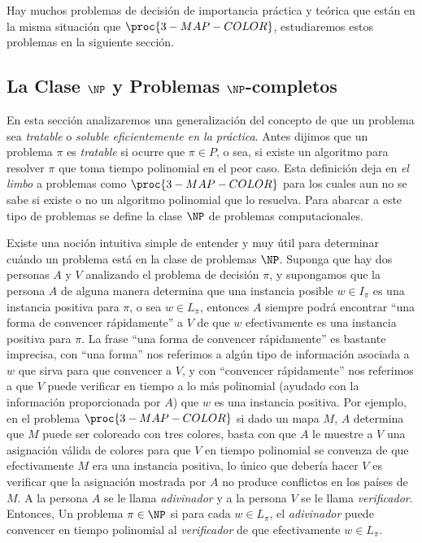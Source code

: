 Hay muchos problemas de decisión de importancia práctica y teórica que están en la misma situación que $\proc{3-MAP-COLOR}$, estudiaremos estos problemas en la siguiente sección.

\subsection{La Clase $\NP$ y Problemas $\NP$-completos}

En esta sección analizaremos una generalización del concepto de que un problema sea \emph{tratable} o \emph{soluble eficientemente en la práctica}.
Antes dijimos que un problema $\pi$ es \emph{tratable} si ocurre que $\pi\in P$, o sea, si existe un algoritmo para resolver $\pi$ que toma tiempo polinomial en el peor caso.
Esta definición deja en \emph{el limbo} a problemas como $\proc{3-MAP-COLOR}$ para los cuales aun no se sabe si existe o no un algoritmo polinomial que lo resuelva.
Para abarcar a este tipo de problemas se define la clase $\NP$ de problemas computacionales.

Existe una noción intuitiva simple de entender y muy útil para determinar cuándo un problema está en la clase de problemas $\NP$.
Suponga que hay dos personas $A$ y $V$ analizando el problema de decisión $\pi$, y supongamos que la persona $A$ de alguna manera determina que una instancia posible $w\in I_\pi$ es una instancia positiva para $\pi$, o sea $w\in L_\pi$, entonces $A$ siempre podrá encontrar ``una forma de convencer rápidamente'' a $V$ de que $w$ efectivamente es una instancia positiva para $\pi$.
La frase ``una forma de convencer rápidamente'' es bastante imprecisa, con ``una forma'' nos referimos a algún tipo de información asociada a $w$ que sirva para que convencer a $V$, y con ``convencer rápidamente'' nos referimos a que $V$ puede verificar en tiempo a lo más polinomial (ayudado con la información proporcionada por $A$) que $w$ es una instancia positiva.
Por ejemplo, en el problema $\proc{3-MAP-COLOR}$ si dado un mapa $M$, $A$ determina que $M$ puede ser coloreado con tres colores, basta con que $A$ le muestre a $V$ una asignación válida de colores para que $V$ en tiempo polinomial se convenza de que efectivamente $M$ era una instancia positiva, lo único que debería hacer $V$ es verificar que la asignación mostrada por $A$ no produce conflictos en los países de $M$.
A la persona $A$ se le llama \emph{adivinador} y a la persona $V$ se le llama \emph{verificador}.
Entonces, Un problema $\pi\in\NP$ si para cada $w\in L_\pi$, el \emph{adivinador} puede convencer en tiempo polinomial al \emph{verificador} de que efectivamente $w\in L_\pi$.

